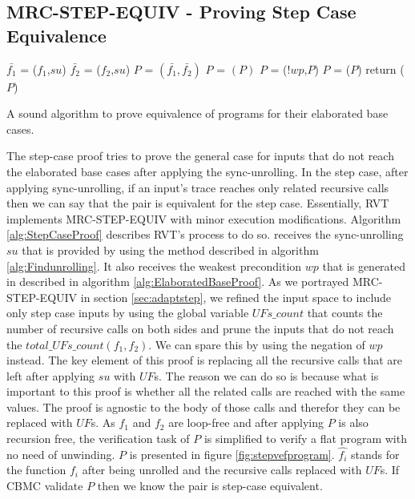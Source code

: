 \subsection{MRC-STEP-EQUIV - Proving Step Case Equivalence}
\label{sec:MRC-STEP-EQUIV}
\noindent
\begin{algorithm}
\begin{minipage}{\linewidth}
\begin{algorithmic}[1]
	\State$\bar{f_1}$ = ($f_1$,$su$)
	\State$\bar{f_2}$ = ($f_2$,$su$)
	\State $P$ = $(\bar{f_1},\bar{f_2})$
	\State $P$ = $(P)$
	\State $P$ = ($!wp$,$P$)
    \State $P$ = ($P$)
    \State return ($P$)
	\EndFunction
\end{algorithmic}
\end{minipage}
\caption{A sound algorithm to prove equivalence of programs for their elaborated base cases.}
\label{alg:StepCaseProof}
\end{algorithm}
The step-case proof tries to prove the general case for inputs that do not reach the elaborated base cases after applying the sync-unrolling. In the step case, after applying sync-unrolling, if an input's trace reaches only related recursive calls then we can say that the pair is equivalent for the step case. Essentially, RVT implements MRC-STEP-EQUIV with minor execution modifications. Algorithm \ref{alg:StepCaseProof} describes RVT's process to do so.
 receives the sync-unrolling $su$ that is provided by using the method described in algorithm \ref{alg:Findunrolling}. It also receives the weakest precondition $wp$ that is generated in  described in algorithm \ref{alg:ElaboratedBaseProof}. As we portrayed MRC-STEP-EQUIV in section \ref{sec:adaptstep}, we refined the input space to include only step case inputs by using the global variable $UFs\_count$ that counts the number of recursive calls on both sides and prune the inputs that do not reach the $total\_UFs\_count(f_1,f_2)$. We can spare this by using the negation of $wp$ instead. The key element of this proof is replacing all the recursive calls that are left after applying $su$ with $UF$s. The reason we can do so is because what is important to this proof is whether all the related calls are reached with the same values. The proof is agnostic to the body of those calls and therefor they can be replaced with $UF$s. As $f_1$ and $f_2$ are loop-free and after applying  $P$ is also recursion free, the verification task of $P$ is simplified to verify a flat program with no need of unwinding. $P$ is presented in figure \ref{fig:stepvefprogram}. $\hat{f_i}$ stands for the function $f_i$ after being unrolled and the recursive calls replaced with $UF$s. If CBMC validate $P$ then we know the pair is step-case equivalent. 
